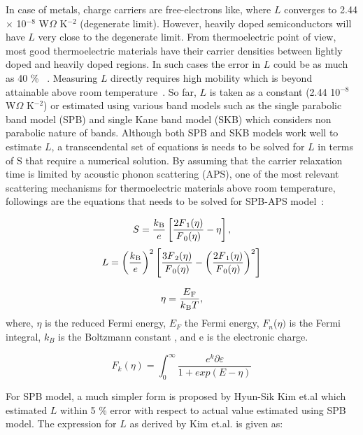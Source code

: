 \documentclass[%
 aip,
 amsmath,amssymb,
reprint, onecolumn %
]{revtex4-1}
\begin{document}
In case of metals, charge carriers are free-electrons like, where $L$ converges to 2.44 $\times$ 10$^{-8}$ W$\Omega$ K$^{-2}$ (degenerate limit). However, heavily doped semiconductors will have $L$ very close to the degenerate limit. From thermoelectric point of view, most good thermoelectric materials have their carrier densities between lightly doped and heavily doped regions. In such cases the error in $L$ could be as much as 40 \% ~\cite{toberer2012advances}.
Measuring $L$ directly requires high mobility which is beyond attainable above room temperature~\cite{lukas2012experimental}. So far, $L$ is taken as a constant (2.44 10$^{-8}$ W$\Omega$ K$^{-2}$) or estimated using various band models such as the single parabolic band model (SPB) and single Kane band model (SKB) which considers non parabolic nature of bands. 
Although both SPB and SKB models work well to estimate $L$, a transcendental set of equations is needs to be solved for $L$ in terms of S that require a numerical solution. 
By assuming that the carrier relaxation time is limited by acoustic phonon scattering (APS), one of the most relevant scattering mechanisms for thermoelectric materials above room temperature, followings are the equations that needs to be solved for SPB-APS model~\cite{pei2011convergence, wood1988materials}: 


\begin{equation}
	S = \frac{k\textsubscript{B} }{e}\left[ \frac{2F\textsubscript{1}(\eta)}{F\textsubscript{0}(\eta)} -\eta \right],
\end{equation}
\begin{equation}
	L = \left(\frac{k\textsubscript{B}}{e}\right)^2\left[\frac{3F\textsubscript{2}(\eta)}{F\textsubscript{0}(\eta)} - \left(\frac{2F\textsubscript{1}(\eta)}{F\textsubscript{0}(\eta)} \right)^2\right]
\end{equation}

\begin{equation}
	\eta = \frac{E\textsubscript{F} }{k\textsubscript{B}T},
\end{equation}
where, $\eta$ is the reduced Fermi energy, $E_F$ the Fermi energy, $F_n$($\eta)$ is the Fermi integral, $k_B$ is the Boltzmann constant , and e is the electronic charge.

\begin{equation}
    F_{k}(\eta) = \int_{0}^{\infty}{\frac{e^k \partial \varepsilon}{1 + exp(E - \eta)}}
\end{equation} 

For SPB model, a much simpler form is proposed by Hyun-Sik Kim et.al which estimated $L$ within 5 \% error with respect to actual value estimated using SPB model\cite{kim2015characterization}. The expression for $L$ as derived by Kim et.al. is given as: 
\end{document}
